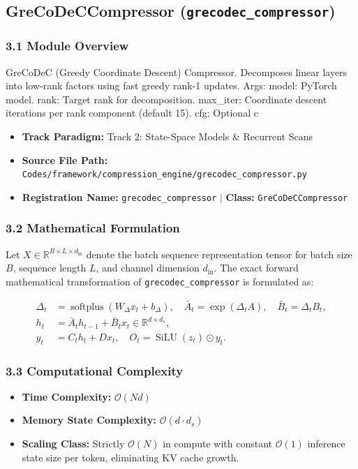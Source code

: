\subsection{GreCoDeCCompressor (\texttt{grecodec\_compressor})}
\label{sec:app_module_grecodec_compressor}

\subsubsection*{3.1 Module Overview}
GreCoDeC (Greedy Coordinate Descent) Compressor. Decomposes linear layers into low-rank factors using fast greedy rank-1 updates.  Args:     model: PyTorch model.     rank: Target rank for decomposition.     max\_iter: Coordinate descent iterations per rank component (default 15).     cfg: Optional c
\begin{itemize}
    \item \textbf{Track Paradigm:} Track 2: State-Space Models & Recurrent Scans
    \item \textbf{Source File Path:} \texttt{Codes/framework/compression\_engine/grecodec\_compressor.py}
    \item \textbf{Registration Name:} \texttt{grecodec\_compressor} $\mid$ \textbf{Class:} \texttt{GreCoDeCCompressor}
\end{itemize}

\subsubsection*{3.2 Mathematical Formulation}
Let $X \in \mathbb{R}^{B \times L \times d_{\text{in}}}$ denote the batch sequence representation tensor for batch size $B$, sequence length $L$, and channel dimension $d_{\text{in}}$. The exact forward mathematical transformation of \texttt{grecodec\_compressor} is formulated as:

\begin{align}
\Delta_t &= \operatorname{softplus}(W_\Delta x_t + b_\Delta), \quad \bar{A}_t = \exp(\Delta_t A), \quad \bar{B}_t = \Delta_t B_t, \\
h_t &= \bar{A}_t h_{t-1} + \bar{B}_t x_t \in \mathbb{R}^{d \times d_s}, \\
y_t &= C_t h_t + D x_t, \quad O_t = \operatorname{SiLU}(z_t) \odot y_t.
\end{align}


\subsubsection*{3.3 Computational Complexity}
\begin{itemize}
    \item \textbf{Time Complexity:} $\mathcal{O}(N d)$
    \item \textbf{Memory State Complexity:} $\mathcal{O}(d \cdot d_s)$
    \item \textbf{Scaling Class:} Strictly $\mathcal{O}(N)$ in compute with constant $\mathcal{O}(1)$ inference state size per token, eliminating KV cache growth.
\end{itemize}

